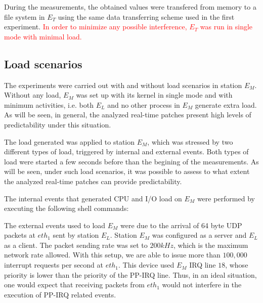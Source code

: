 \documentclass{acm_proc_article-sp}
\newcommand{\col}[1]{\textcolor{red}{#1}}
\begin{document}
During the measurements, the obtained values were transfered from memory to a file
system in $E_T$ using the same data transferring scheme used in the first
experiment. \col{In order to minimize any possible interference, $E_T$ was run in
  single mode with minimal load.}

\subsection{Load scenarios}
\label{sec:carga}

The experiments were carried out with and without load scenarios in station
$E_M$. Without any load, $E_M$ was set up with its kernel in single mode and with
minimum activities, i.e. both $E_L$ and no other process in $E_M$ generate extra
load. As will be seen, in general, the analyzed real-time patches present high
levels of predictability under this situation.

The load generated was applied to station $E_M$, which was stressed by two different
types of load, triggered by internal and external events. Both types of load were
started a few seconds before than the begining of the measurements.  As will be
seen, under such load scenarios, it was possible to assess to what extent the
analyzed real-time patches can provide predictability.

The internal events that generated CPU and I/O load on $E_M$ were performed by
executing the following shell commands:


The external events used to load $E_M$ were due to the arrival of 64 byte UDP
packets at $eth_1$ sent by station $E_L$. Station $E_M$ was configured as a server
and $E_L$ as a client. The packet sending rate was set to $200 kHz$, which is the
maximum network rate allowed. With this setup, we are able to issue more than $100,000$
interrupt requests per second at $eth_1$. This device used $E_M$
IRQ line $18$, whose priority is lower than the priority of the PP-IRQ line. Thus,
in an ideal situation, one would expect that receiving packets from $eth_1$ would
not interfere in the execution of PP-IRQ related events.
\end{document}
